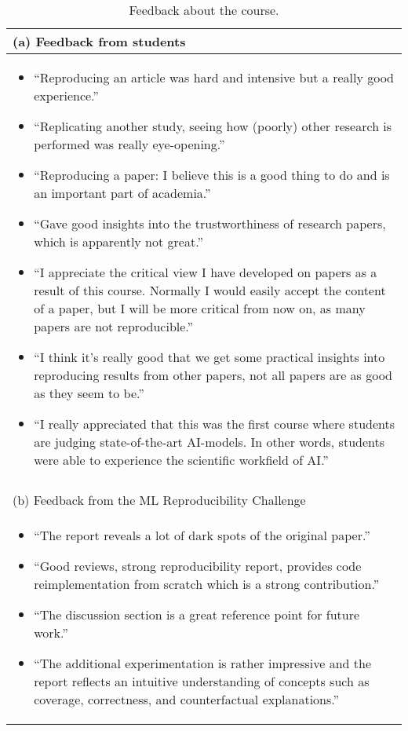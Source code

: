 \begin{table}[htp]
\caption{Feedback about the course.}
\centering
\begin{tabular}{@{}l@{}}
\toprule
(a) Feedback from students \\
\midrule
\begin{minipage}[t]{\columnwidth}
\begin{itemize}[leftmargin=*]
    \item ``Reproducing an article was hard and intensive but a really good experience.''
     \item ``Replicating another study, seeing how (poorly) other research is performed was really eye-opening.''
    \item ``Reproducing a paper: I believe this is a good thing to do and is an important part of academia.''
    \item  ``Gave good insights into the trustworthiness of research papers, which is apparently not great.''
    \item ``I appreciate the critical view I have developed on papers as a result of this course. Normally I would easily accept the content of a paper, but I will be more critical from now on, as many papers are not reproducible.''
    \item ``I think it's really good that we get some practical insights into reproducing results from other papers, not all papers are as good as they seem to be.''
    \item ``I really appreciated that this was the first course where students are judging state-of-the-art AI-models. In other words, students were able to experience the scientific workfield of AI.''
\end{itemize}
\end{minipage}
\\ \\
\midrule
(b) Feedback from the ML Reproducibility Challenge \\
\midrule
\begin{minipage}[t]{\columnwidth}
\begin{itemize}[leftmargin=*]
\item ``The report reveals a lot of dark spots of the original paper.''
\item ``Good reviews, strong reproducibility report, provides code reimplementation from scratch which is a strong contribution.''
\item ``The discussion section is a great reference point for future work.''
\item ``The additional experimentation is rather impressive and the report reflects  an intuitive understanding of concepts such as  coverage, correctness, and counterfactual explanations.''

\end{itemize}
\end{minipage}
\end{tabular}
\end{table}
